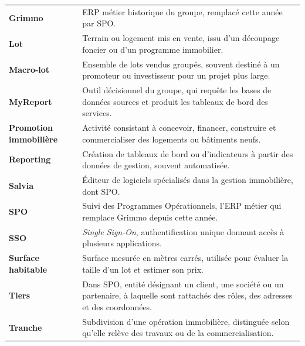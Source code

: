 \begin{longtable}{p{4cm} p{11cm}}
\textbf{Grimmo} & ERP métier historique du groupe, remplacé cette année par SPO. \\
\textbf{Lot} & Terrain ou logement mis en vente, issu d'un découpage foncier ou d'un programme immobilier. \\
\textbf{Macro-lot} & Ensemble de lots vendus groupés, souvent destiné à un promoteur ou investisseur pour un projet plus large. \\
\textbf{MyReport} & Outil décisionnel du groupe, qui requête les bases de données sources et produit les tableaux de bord des services. \\
\textbf{Promotion immobilière} & Activité consistant à concevoir, financer, construire et commercialiser des logements ou bâtiments neufs. \\
\textbf{Reporting} & Création de tableaux de bord ou d'indicateurs à partir des données de gestion, souvent automatisée. \\
\textbf{Salvia} & Éditeur de logiciels spécialisés dans la gestion immobilière, dont SPO. \\
\textbf{SPO} & Suivi des Programmes Opérationnels, l'ERP métier qui remplace Grimmo depuis cette année. \\
\textbf{SSO} & \emph{Single Sign-On}, authentification unique donnant accès à plusieurs applications. \\
\textbf{Surface habitable} & Surface mesurée en mètres carrés, utilisée pour évaluer la taille d'un lot et estimer son prix. \\
\textbf{Tiers} & Dans SPO, entité désignant un client, une société ou un partenaire, à laquelle sont rattachés des rôles, des adresses et des coordonnées. \\
\textbf{Tranche} & Subdivision d'une opération immobilière, distinguée selon qu'elle relève des travaux ou de la commercialisation. \\
\end{longtable}
